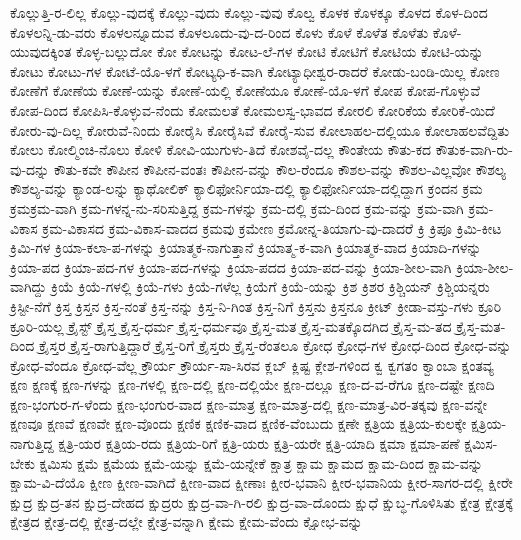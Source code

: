 {ಕೊಲ್ಲುತ್ತಿ-ರ-ಲಿಲ್ಲ
ಕೊಲ್ಲು-ವುದಕ್ಕೆ
ಕೊಲ್ಲು-ವುದು
ಕೊಲ್ಲು-ವುವು
ಕೊಲ್ವ
ಕೊಳಕ
ಕೊಳಕ್ಕೂ
ಕೊಳದ
ಕೊಳ-ದಿಂದ
ಕೊಳಲನ್ನಿ-ಡು-ವರು
ಕೊಳಲನ್ನೂದುವ
ಕೊಳಲೂದು-ವು-ದ-ರಿಂದ
ಕೊಳು
ಕೊಳೆ
ಕೊಳೆತ
ಕೊಳೆತು
ಕೊಳೆ-ಯುವುದಕ್ಕಿಂತ
ಕೊಳ್ಳ-ಬಲ್ಲುದೋ
ಕೋ
ಕೋಟನ್ನು
ಕೋಟ-ಲೆ-ಗಳ
ಕೋಟಿ
ಕೋಟಿಗೆ
ಕೋಟಿಯ
ಕೋಟಿ-ಯನ್ನು
ಕೋಟು
ಕೋಟು-ಗಳ
ಕೋಟೆ-ಯೊ-ಳಗೆ
ಕೋಟ್ಯಧಿ-ಕ-ವಾಗಿ
ಕೋಟ್ಯಾಧೀಶ್ವರ-ರಾದರೆ
ಕೋಡು-ಬಂಡಿ-ಯಿಲ್ಲ
ಕೋಣ
ಕೋಣೆಗೆ
ಕೋಣೆಯ
ಕೋಣೆ-ಯನ್ನು
ಕೋಣೆ-ಯಲ್ಲಿ
ಕೋಣೆಯೂ
ಕೋಣೆ-ಯೊ-ಳಗೆ
ಕೋಪ
ಕೋಪ-ಗೊಳ್ಳುವೆ
ಕೋಪ-ದಿಂದ
ಕೋಪಿಸಿ-ಕೊಳ್ಳುವ-ನೆಂದು
ಕೋಮಲತೆ
ಕೋಮಲಸ್ವ-ಭಾವದ
ಕೋರಲಿ
ಕೋರಿಕೆಯ
ಕೋರಿಕೆ-ಯಿದೆ
ಕೋರು-ವು-ದಿಲ್ಲ
ಕೋರುವೆ-ನಿಂದು
ಕೋರೈಸಿ
ಕೋರೈಸಿವೆ
ಕೋರೈ-ಸುವ
ಕೋಲಾಹಲ-ದಲ್ಲಿಯೂ
ಕೋಲಾಹಲವೆದ್ದಿತು
ಕೋಲು
ಕೋಲ್ಮಿಂಚಿ-ನೊಲು
ಕೋಳಿ
ಕೋವಿ-ಯುಗುಳು-ತಿದೆ
ಕೋಶವೈ-ದಲ್ಲ
ಕೌಂತೇಯ
ಕೌತು-ಕದ
ಕೌತುಕ-ವಾಗಿ-ರು-ವು-ದನ್ನು
ಕೌತು-ಕವೇ
ಕೌಪೀನ
ಕೌಪೀನ-ವಂತಃ
ಕೌಪೀನ-ವನ್ನು
ಕೌಲ-ರೆಂದೂ
ಕೌಶಲ-ವನ್ನು
ಕೌಶಲ-ವಿಲ್ಲವೋ
ಕೌಶಲ್ಯ
ಕೌಶಲ್ಯ-ವನ್ನು
ಕ್ಯಾಂಡ-ಲನ್ನು
ಕ್ಯಾಥೋಲಿಕ್
ಕ್ಯಾಲಿಫೋರ್ನಿಯಾ-ದಲ್ಲಿ
ಕ್ಯಾಲಿಫೋರ್ನಿಯಾ-ದಲ್ಲಿದ್ದಾಗ
ಕ್ರಂದನ
ಕ್ರಮ
ಕ್ರಮಕ್ರಮ-ವಾಗಿ
ಕ್ರಮ-ಗಳನ್ನ-ನು-ಸರಿಸುತ್ತಿದ್ದ
ಕ್ರಮ-ಗಳನ್ನು
ಕ್ರಮ-ದಲ್ಲಿ
ಕ್ರಮ-ದಿಂದ
ಕ್ರಮ-ವನ್ನು
ಕ್ರಮ-ವಾಗಿ
ಕ್ರಮ-ವಿಕಾಸ
ಕ್ರಮ-ವಿಕಾಸದ
ಕ್ರಮ-ವಿಕಾಸ-ವಾದದ
ಕ್ರಮವು
ಕ್ರಮೇಣ
ಕ್ರಮೋನ್ನ-ತಿಯಾಗು-ವು-ದಾದರೆ
ಕ್ರಿ
ಕ್ರಿಪೂ
ಕ್ರಿಮಿ-ಕೀಟ
ಕ್ರಿಮಿ-ಗಳ
ಕ್ರಿಯಾ-ಕಲಾ-ಪ-ಗಳನ್ನು
ಕ್ರಿಯಾತ್ಮಕ-ನಾಗುತ್ತಾನೆ
ಕ್ರಿಯಾತ್ಮ-ಕ-ವಾಗಿ
ಕ್ರಿಯಾತ್ಮಕ-ವಾದ
ಕ್ರಿಯಾದಿ-ಗಳನ್ನು
ಕ್ರಿಯಾ-ಪದ
ಕ್ರಿಯಾ-ಪದ-ಗಳ
ಕ್ರಿಯಾ-ಪದ-ಗಳನ್ನು
ಕ್ರಿಯಾ-ಪದದ
ಕ್ರಿಯಾ-ಪದ-ವನ್ನು
ಕ್ರಿಯಾ-ಶೀಲ-ವಾಗಿ
ಕ್ರಿಯಾ-ಶೀಲ-ವಾಗಿದ್ದು
ಕ್ರಿಯೆ
ಕ್ರಿಯೆ-ಗಳಲ್ಲಿ
ಕ್ರಿಯೆ-ಗಳು
ಕ್ರಿಯೆ-ಗಳೆಲ್ಲ
ಕ್ರಿಯೆಗೆ
ಕ್ರಿಯೆ-ಯನ್ನು
ಕ್ರಿಶ
ಕ್ರಿಶರ
ಕ್ರಿಶ್ಚಿಯನ್
ಕ್ರಿಶ್ಚಿಯನ್ನರು
ಕ್ರಿಸ್ಟೀ-ನೆಗೆ
ಕ್ರಿಸ್ತ
ಕ್ರಿಸ್ತನ
ಕ್ರಿಸ್ತ-ನಂತೆ
ಕ್ರಿಸ್ತ-ನನ್ನು
ಕ್ರಿಸ್ತ-ನಿ-ಗಿಂತ
ಕ್ರಿಸ್ತ-ನಿಗೆ
ಕ್ರಿಸ್ತನು
ಕ್ರಿಸ್ತನೂ
ಕ್ರೀಟ್
ಕ್ರೀಡಾ-ವಸ್ತು-ಗಳು
ಕ್ರೂರಿ
ಕ್ರೂರಿ-ಯಲ್ಲ
ಕ್ರೈಸ್ಟ್
ಕ್ರೈಸ್ತ
ಕ್ರೈಸ್ತ-ಧರ್ಮ
ಕ್ರೈಸ್ತ-ಧರ್ಮವೂ
ಕ್ರೈಸ್ತ-ಮತ
ಕ್ರೈಸ್ತ-ಮತಕ್ಕೊದಗಿದ
ಕ್ರೈಸ್ತ-ಮ-ತದ
ಕ್ರೈಸ್ತ-ಮತ-ದಿಂದ
ಕ್ರೈಸ್ತರ
ಕ್ರೈಸ್ತ-ರಾಗುತ್ತಿದ್ದಾರೆ
ಕ್ರೈಸ್ತ-ರಿಗೆ
ಕ್ರೈಸ್ತರು
ಕ್ರೈಸ್ತ-ರೆಂತಲೂ
ಕ್ರೋಧ
ಕ್ರೋಧ-ಗಳ
ಕ್ರೋಧ-ದಿಂದ
ಕ್ರೋಧ-ವನ್ನು
ಕ್ರೋಧ-ವೆಂದೂ
ಕ್ರೋಧ-ವೆಲ್ಲ
ಕ್ರೌರ್ಯ
ಕ್ರೌರ್ಯ-ಸಾ-ಸಿರವ
ಕ್ಲಬ್
ಕ್ಲಿಷ್ಟ
ಕ್ಲೇಶ-ಗಳಿಂದ
ಕ್ವ
ಕ್ವಗತಂ
ಕ್ವಾಂಬಾ
ಕ್ಷಂತವ್ಯ
ಕ್ಷಣ
ಕ್ಷಣಕ್ಕೆ
ಕ್ಷಣ-ಗಳನ್ನು
ಕ್ಷಣ-ಗಳಲ್ಲಿ
ಕ್ಷಣ-ದಲ್ಲಿ
ಕ್ಷಣ-ದಲ್ಲಿಯೇ
ಕ್ಷಣ-ದಲ್ಲೂ
ಕ್ಷಣ-ದ-ವ-ರೆಗೂ
ಕ್ಷಣ-ದಷ್ಟೇ
ಕ್ಷಣದಿ
ಕ್ಷಣ-ಭಂಗುರ-ಗ-ಳೆಂದು
ಕ್ಷಣ-ಭಂಗುರ-ವಾದ
ಕ್ಷಣ-ಮಾತ್ರ
ಕ್ಷಣ-ಮಾತ್ರ-ದಲ್ಲಿ
ಕ್ಷಣ-ಮಾತ್ರ-ವಿರ-ತಕ್ಕವು
ಕ್ಷಣ-ವನ್ನೇ
ಕ್ಷಣವೂ
ಕ್ಷಣವೆ
ಕ್ಷಣವೇ
ಕ್ಷಣ-ವೊಂದು
ಕ್ಷಣಿಕ
ಕ್ಷಣಿಕ-ವಾದ
ಕ್ಷಣಿಕ-ವೆಂಬುದು
ಕ್ಷಣೇ
ಕ್ಷತ್ರಿಯ
ಕ್ಷತ್ರಿಯ-ಕುಲಕ್ಕೇ
ಕ್ಷತ್ರಿಯ-ನಾಗುತ್ತಿದ್ದ
ಕ್ಷತ್ರಿ-ಯರ
ಕ್ಷತ್ರಿಯ-ರದು
ಕ್ಷತ್ರಿಯ-ರಿಗೆ
ಕ್ಷತ್ರಿ-ಯರು
ಕ್ಷತ್ರಿ-ಯರೇ
ಕ್ಷತ್ರಿ-ಯಾದಿ
ಕ್ಷಮಾ
ಕ್ಷಮಾ-ಪಣೆ
ಕ್ಷಮಿಸ-ಬೇಕು
ಕ್ಷಮಿಸು
ಕ್ಷಮೆ
ಕ್ಷಮೆಯ
ಕ್ಷಮೆ-ಯನ್ನು
ಕ್ಷಮೆ-ಯನ್ನೇಕೆ
ಕ್ಷಾತ್ರ
ಕ್ಷಾಮ
ಕ್ಷಾಮದ
ಕ್ಷಾಮ-ದಿಂದ
ಕ್ಷಾಮ-ವನ್ನು
ಕ್ಷಾಮ-ವಿ-ದೆಯೊ
ಕ್ಷೀಣ
ಕ್ಷೀಣ-ವಾಗಿದೆ
ಕ್ಷೀಣ-ವಾದ
ಕ್ಷೀಣಾಃ
ಕ್ಷೀರ-ಭವಾನಿ
ಕ್ಷೀರ-ಭವಾನಿಯ
ಕ್ಷೀರ-ಸಾಗರ-ದಲ್ಲಿ
ಕ್ಷೀರೇ
ಕ್ಷುದ್ರ
ಕ್ಷುದ್ರ-ತನ
ಕ್ಷುದ್ರ-ದೇಹದ
ಕ್ಷುದ್ರರು
ಕ್ಷುದ್ರ-ವಾ-ಗಿ-ರಲಿ
ಕ್ಷುದ್ರ-ವಾ-ದೊಂದು
ಕ್ಷುಧೆ
ಕ್ಷುಬ್ಧ-ಗೊಳಿಸಿತು
ಕ್ಷೇತ್ರ
ಕ್ಷೇತ್ರಕ್ಕೆ
ಕ್ಷೇತ್ರದ
ಕ್ಷೇತ್ರ-ದಲ್ಲಿ
ಕ್ಷೇತ್ರ-ದಲ್ಲೇ
ಕ್ಷೇತ್ರ-ವನ್ನಾಗಿ
ಕ್ಷೇಮ
ಕ್ಷೇಮ-ವೆಂದು
ಕ್ಷೋಭ-ವನ್ನು
}

